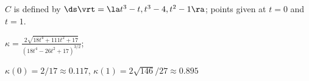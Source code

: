 {$C$ is defined by $\ds \vrt = \la t^3-t,t^3-4,t^2-1\ra $; points given at $t=0$ and $t=1$. 
}
{$\kappa = \frac{2 \sqrt{18 t^4+111
   t^2+17}}{\left(18 t^4-26
   t^2+17\right)^{3/2}}$;

$\kappa(0) = 2/17\approx 0.117$, $\kappa(1) = 2\sqrt{146}/27\approx 0.895$
}